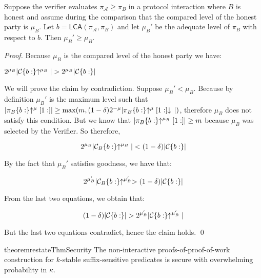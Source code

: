 
\begin{lemma}
Suppose the verifier evaluates $\pi_\mathcal{A} \geq \pi_B$ in a protocol
interaction where $B$ is honest and assume during the comparison that the
compared level of the honest party is $\mu_B$. Let $b =
\textsf{LCA}(\pi_\mathcal{A}, \pi_B)$ and let $\mu_B'$ be the adequate
level of $\pi_B$ with respect to $b$. Then $\mu_B' \geq \mu_B$.
\end{lemma}
\begin{proof}
    Because $\mu_B$ is the compared level of the honest party we have:

    $2^{\mu_B}|\mathcal{C}\{b:\}\negthickspace\uparrow^{\mu_B}| > 2^{\mu_B}|\mathcal{C}\{b:\}|$

    We will prove the claim by contradiction. Suppose $\mu_B' < \mu_B$. Because
    by definition $\mu_B'$ is the maximum level such that
    $|\pi_B\{b:\}\negthickspace\uparrow^\mu[1:]| \geq \max(m, (1 -
    \delta)2^{-\mu}|\pi_B\{b:\}\negthickspace\uparrow^\mu[1:]\negthickspace\downarrow\,|)$, therefore
    $\mu_B$ does not satisfy this condition. But we know that
    $|\pi_B\{b:\}\negthickspace\uparrow^{\mu_B}[1:]| \geq m$ because $\mu_B$ was selected by
    the Verifier. So therefore,

    \begin{equation*}
    2^{\mu_B}|\mathcal{C}_B\{b:\}\negthickspace\uparrow^{\mu_B}| < (1 - \delta)|\mathcal{C}\{b:\}|
    \end{equation*}

    By the fact that $\mu_B'$ satisfies goodness, we have that:

    \begin{equation*}
    2^{\mu_B'}|\mathcal{C}_B\{b:\}\negthickspace\uparrow^{\mu_B'} > (1 - \delta)|\mathcal{C}\{b:\}|
    \end{equation*}

    From the last two equations, we obtain that:

    \begin{equation*}
    (1 - \delta)|\mathcal{C}\{b:\}| > 2^{\mu_B'}|\mathcal{C}\{b:\}\negthickspace\uparrow^{\mu_B'}|
    \end{equation*}

    But the last two equations contradict, hence the claim holds.
    \qed
\end{proof}

\begin{restatable}{theorem}{restateThmSecurity}
    \label{thm.security}
    The non-interactive proofs-of-proof-of-work construction for $k$-stable
    suffix-sensitive predicates is secure with overwhelming probability in
    $\kappa$.
\end{restatable}

